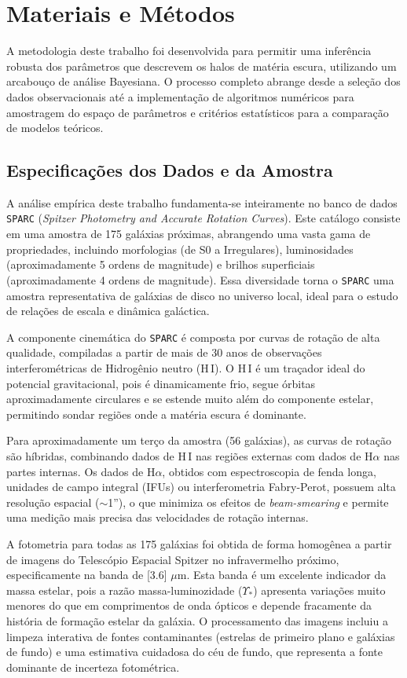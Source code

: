\documentclass[a4paper]{article}
\begin{document}
\section{Materiais e Métodos}
A metodologia deste trabalho foi desenvolvida para permitir uma inferência robusta dos parâmetros que descrevem os halos de matéria escura, utilizando um arcabouço de análise Bayesiana. O processo completo abrange desde a seleção dos dados observacionais até a implementação de algoritmos numéricos para amostragem do espaço de parâmetros e critérios estatísticos para a comparação de modelos teóricos.

\subsection{Especificações dos Dados e da Amostra}
A análise empírica deste trabalho fundamenta-se inteiramente no banco de dados \texttt{SPARC} (\textit{Spitzer Photometry and Accurate Rotation Curves}). Este catálogo consiste em uma amostra de 175 galáxias próximas, abrangendo uma vasta gama de propriedades, incluindo morfologias (de S0 a Irregulares), luminosidades (aproximadamente 5 ordens de magnitude) e brilhos superficiais (aproximadamente 4 ordens de magnitude). Essa diversidade torna o \texttt{SPARC} uma amostra representativa de galáxias de disco no universo local, ideal para o estudo de relações de escala e dinâmica galáctica.

A componente cinemática do \texttt{SPARC} é composta por curvas de rotação de alta qualidade, compiladas a partir de mais de 30 anos de observações interferométricas de Hidrogênio neutro (H\,I). O H\,I é um traçador ideal do potencial gravitacional, pois é dinamicamente frio, segue órbitas aproximadamente circulares e se estende muito além do componente estelar, permitindo sondar regiões onde a matéria escura é dominante.

Para aproximadamente um terço da amostra (56 galáxias), as curvas de rotação são híbridas, combinando dados de H\,I nas regiões externas com dados de H$\alpha$ nas partes internas. Os dados de H$\alpha$, obtidos com espectroscopia de fenda longa, unidades de campo integral (IFUs) ou interferometria Fabry-Perot, possuem alta resolução espacial ($\sim$1''), o que minimiza os efeitos de \textit{beam-smearing} e permite uma medição mais precisa das velocidades de rotação internas.

A fotometria para todas as 175 galáxias foi obtida de forma homogênea a partir de imagens do Telescópio Espacial Spitzer no infravermelho próximo, especificamente na banda de [3.6] $\mu$m. Esta banda é um excelente indicador da massa estelar, pois a razão massa-luminozidade ($\Upsilon_{*}$) apresenta variações muito menores do que em comprimentos de onda ópticos e depende fracamente da história de formação estelar da galáxia. O processamento das imagens incluiu a limpeza interativa de fontes contaminantes (estrelas de primeiro plano e galáxias de fundo) e uma estimativa cuidadosa do céu de fundo, que representa a fonte dominante de incerteza fotométrica.
\end{document}

